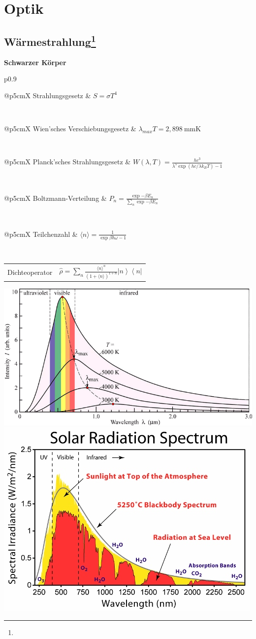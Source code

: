 \documentclass[12pt,a4paper, twoside]{article}
\makeatletter
\newcommand{\ket}[1]{\left| #1 \right>}
\newcommand{\bra}[1]{\left< #1 \right|}
\renewcommand{\=}[1]{\stackrel{#1}{=}}
\newcommand{\erw}[1]{\langle #1 \rangle}
\theoremstyle{definition}
\theoremstyle{remark}
\newcommand{\concept}[2]{%
\noindent
\begin{framed}
\noindent\textbf{#1}
\par\begin{tabular}{p{0.9\linewidth}}
#2
\end{tabular}
\end{framed}
}
\newcommand{\f}[2]{%
\noindent\begin{tabularx}{\linewidth}{@{}p{5cm}X}
#1 & $#2$
\end{tabularx}}
\makeatother
\begin{document}
\newpage
\section{Optik}

\subsection[Wärmestrahlung]{Wärmestrahlung\let\thefootnote\relax\footnote{}}

\concept{Schwarzer Körper}{
\f{Strahlungsgesetz}{S = \sigma T^4}\\
\f{Wien'sches Verschiebungsgesetz}{\lambda_{max} T = 2,898~\text{mmK}}\\
\f{Planck'sches Strahlungsgesetz}{W(\lambda, T)  = \frac{hc^3}{\lambda^5 \exp{(hc/ \lambda k_B T)} - 1}}\\
\f{Boltzmann-Verteilung}{P_n = \frac{\exp{- \beta E_n}}{\sum_n \exp{-\beta E_n}}}\\
\f{Teilchenzahl}{\erw{n} = \frac{1}{\exp{\beta \hbar \omega} - 1}}\\
\f{Dichteoperator}{\hat \rho = \sum_n \frac{\erw{n}^n}{(1+\erw{n})^{1+n}} \ket n \bra n}
}

\includegraphics[width=\linewidth]{pic/planck.png}\\
\includegraphics[width=\linewidth]{pic/sonnenspektrum.jpg}\\
\end{document}
